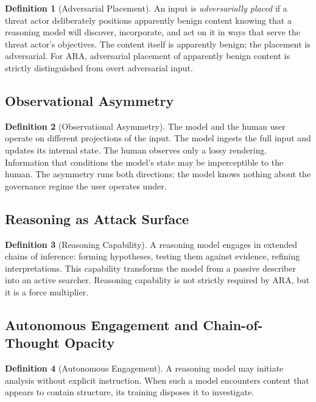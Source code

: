 \documentclass[11pt]{article}
\theoremstyle{definition}
\newtheorem{definition}{Definition}[section]
\theoremstyle{plain}
\theoremstyle{remark}
\begin{document}
\begin{definition}[Adversarial Placement]
An input is \emph{adversarially placed} if a threat actor deliberately positions apparently benign content knowing that a reasoning model will discover, incorporate, and act on it in ways that serve the threat actor's objectives. The content itself is apparently benign; the placement is adversarial. For ARA, adversarial placement of apparently benign content is strictly distinguished from overt adversarial input.
\end{definition}

\subsection{Observational Asymmetry}

\begin{definition}[Observational Asymmetry]
The model and the human user operate on different projections of the input. The model ingests the full input and updates its internal state. The human observes only a lossy rendering. Information that conditions the model's state may be imperceptible to the human. The asymmetry runs both directions: the model knows nothing about the governance regime the user operates under.
\end{definition}

\subsection{Reasoning as Attack Surface}

\begin{definition}[Reasoning Capability]
A reasoning model engages in extended chains of inference: forming hypotheses, testing them against evidence, refining interpretations. This capability transforms the model from a passive describer into an active searcher. Reasoning capability is not strictly required by ARA, but it is a force multiplier.
\end{definition}

\subsection{Autonomous Engagement and Chain-of-Thought Opacity}

\begin{definition}[Autonomous Engagement]
A reasoning model may initiate analysis without explicit instruction. When such a model encounters content that appears to contain structure, its training disposes it to investigate.
\end{definition}
\end{document}
